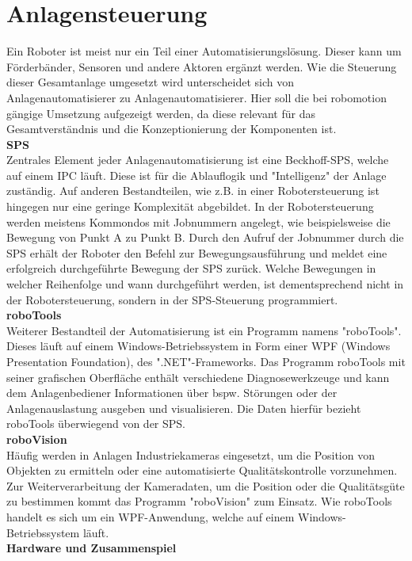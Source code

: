 \documentclass[ a4paper,
                oneside,
                toc=bibliography,
                toc=listof
                ]{scrbook}
\begin{document}
   	\section{Anlagensteuerung}
   	Ein Roboter ist meist nur ein Teil einer Automatisierungslösung. Dieser kann um Förderbänder, Sensoren und andere Aktoren ergänzt werden. Wie die Steuerung dieser Gesamtanlage umgesetzt wird unterscheidet sich von Anlagenautomatisierer zu Anlagenautomatisierer. Hier soll die bei robomotion gängige Umsetzung aufgezeigt werden, da diese relevant für das Gesamtverständnis und die Konzeptionierung der Komponenten ist. \\
   	\textbf{SPS}\\
   	Zentrales Element jeder Anlagenautomatisierung ist eine Beckhoff-SPS, welche auf einem IPC läuft. Diese ist für die Ablauflogik und "Intelligenz" der Anlage zuständig. Auf anderen Bestandteilen, wie z.B. in einer Robotersteuerung ist hingegen nur eine geringe Komplexität abgebildet. In der Robotersteuerung werden meistens Kommondos mit Jobnummern angelegt, wie beispielsweise die Bewegung von Punkt A zu Punkt B. Durch den Aufruf der Jobnummer durch die SPS erhält der Roboter den Befehl zur Bewegungsausführung und meldet eine erfolgreich durchgeführte Bewegung der SPS zurück. Welche Bewegungen in welcher Reihenfolge und wann durchgeführt werden, ist dementsprechend nicht in der Robotersteuerung, sondern in der SPS-Steuerung programmiert.\\
   	\textbf{roboTools} \\
   	Weiterer Bestandteil der Automatisierung ist ein Programm namens "roboTools". Dieses läuft auf einem Windows-Betriebssystem in Form einer WPF (Windows Presentation Foundation), des ".NET"-Frameworks. Das Programm roboTools mit seiner grafischen Oberfläche enthält verschiedene Diagnosewerkzeuge und kann dem Anlagenbediener Informationen über bspw. Störungen oder der Anlagenauslastung ausgeben und visualisieren. Die Daten hierfür bezieht roboTools überwiegend von der SPS. \\
   	\textbf{roboVision}\\
   	Häufig werden in Anlagen Industriekameras eingesetzt, um die Position von Objekten zu ermitteln oder eine automatisierte Qualitätskontrolle vorzunehmen. Zur Weiterverarbeitung der Kameradaten, um die Position oder die Qualitätsgüte zu bestimmen kommt das Programm "roboVision" zum Einsatz. Wie roboTools handelt es sich um ein WPF-Anwendung, welche auf einem Windows-Betriebssystem läuft. \\
   	\textbf{Hardware und Zusammenspiel}\\
\end{document}

